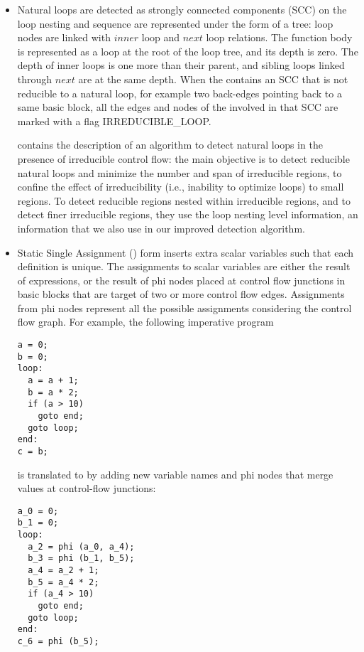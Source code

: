 \documentclass{sig-alternate}
\begin{document}
\begin{itemize}
\label{subsec:loop-tree}
\item Natural loops \cite{dragonbook, ramalingam} are detected as strongly connected
  components (SCC) \cite{tarjan} on the \CFG{,} loop nesting and sequence are
  represented under the form of a tree: loop nodes are linked with $inner$ loop
  and $next$ loop relations.  The function body is represented as a loop at the
  root of the loop tree, and its depth is zero.  The depth of inner loops is one
  more than their parent, and sibling loops linked through $next$ are at the
  same depth.  When the \CFG{} contains an SCC that is not reducible to a natural
  loop, for example two back-edges pointing back to a same basic block, all the
  edges and nodes of the \CFG{} involved in that SCC are marked with a flag
  IRREDUCIBLE\_LOOP.

  \cite{sreedhar1996identifying} contains the description of an algorithm to
  detect natural loops in the presence of irreducible control flow: the main
  objective is to detect reducible natural loops and minimize the number and
  span of irreducible regions, to confine the effect of irreducibility (i.e.,
  inability to optimize loops) to small regions.  To detect reducible regions
  nested within irreducible regions, and to detect finer irreducible regions,
  they use the loop nesting level information, an information that we also use
  in our improved \SCoP{} detection algorithm.

\item Static Single Assignment (\SSA) form \cite{cytron} inserts extra scalar
  variables such that each definition is unique.  The assignments to scalar
  variables are either the result of expressions, or the result of phi nodes
  placed at control flow junctions in basic blocks that are target of two or
  more control flow edges.  Assignments from phi nodes represent all the
  possible assignments considering the control flow graph.  For example, the
  following imperative program
  \begin{verbatim}
a = 0;
b = 0;
loop:
  a = a + 1;
  b = a * 2;
  if (a > 10)
    goto end;
  goto loop;
end:
c = b;
  \end{verbatim}
  is translated to \SSA{} by adding new variable names and phi nodes that merge
  values at control-flow junctions:
  \begin{verbatim}
a_0 = 0;
b_1 = 0;
loop:
  a_2 = phi (a_0, a_4);
  b_3 = phi (b_1, b_5);
  a_4 = a_2 + 1;
  b_5 = a_4 * 2;
  if (a_4 > 10)
    goto end;
  goto loop;
end:
c_6 = phi (b_5);
  \end{verbatim}


\end{itemize}
\end{document}

